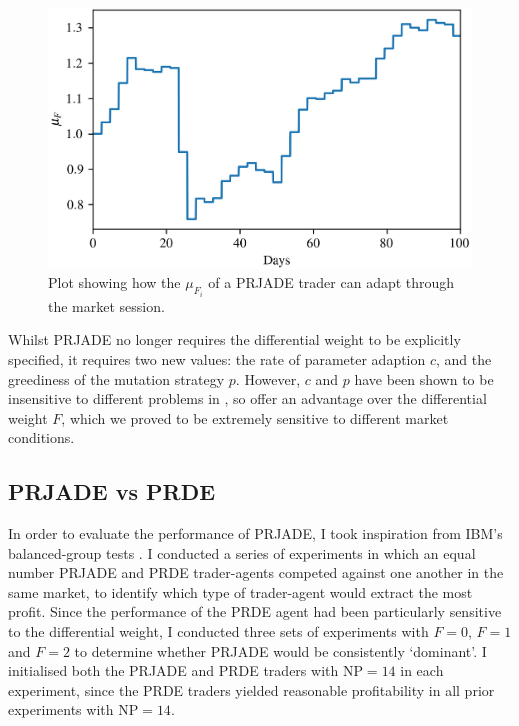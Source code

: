 \documentclass[conference]{IEEEtran}
\begin{document}
\begin{figure}[htbp]
    \centerline{\includegraphics[width=\columnwidth]{mu_F_2.0.png}}
    \caption{
        Plot showing how the $\mu_{F_i}$ of a PRJADE trader can adapt through the market session.
    }
    \label{mu_F}
\end{figure}

Whilst PRJADE no longer requires the differential weight to be explicitly specified, it requires two new values: the rate of parameter adaption $c$, and the greediness of the mutation strategy $p$.
However, $c$ and $p$ have been shown to be insensitive to different problems in \cite{ZhangSanderson}, so offer an advantage over the differential weight $F$, which we proved to be extremely sensitive to different market conditions. 

\subsection{PRJADE vs PRDE}

In order to evaluate the performance of PRJADE, I took inspiration from IBM's balanced-group tests \cite{TesauroDas}.
I conducted a series of experiments in which an equal number PRJADE and PRDE trader-agents competed against one another in the same market, to identify which type of trader-agent would extract the most profit.
Since the performance of the PRDE agent had been particularly sensitive to the differential weight, I conducted three sets of experiments with $F=0$, $F=1$ and $F=2$ to determine whether PRJADE would be consistently `dominant'.
I initialised both the PRJADE and PRDE traders with $\mathrm{NP}=14$ in each experiment, since the PRDE traders yielded reasonable profitability in all prior experiments with $\mathrm{NP}=14$.
\end{document}
